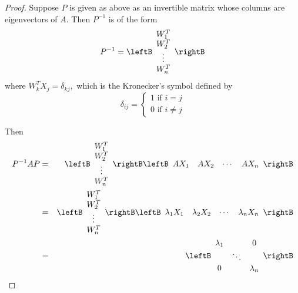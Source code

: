 \begin{proof}
Suppose $P$ is given as above as an invertible matrix whose columns are eigenvectors of $A$. Then $P^{-1}$
is of the form
\begin{equation*}
P^{-1}=\leftB
\begin{array}{c}
W_{1}^{T} \\
W_{2}^{T} \\
\vdots \\
W_{n}^{T}
\end{array}
\rightB
\end{equation*}
where $W_{k}^{T}X_{j}=\delta _{kj},$ which is the Kronecker's symbol defined by
\begin{equation*}
\delta _{ij}=\left\{
\begin{array}{c}
1
\text{ if }i=j \\
0\text{ if }i\neq j
\end{array}
\right.
\end{equation*}

Then
\begin{eqnarray*}
P^{-1}AP & = & 
\leftB
\begin{array}{c}
W_{1}^{T} \\
W_{2}^{T} \\
\vdots \\
W_{n}^{T}
\end{array}
\rightB \leftB
\begin{array}{cccc}
AX_{1} & AX_{2} & \cdots & AX_{n}
\end{array}
\rightB \\
& = & 
\leftB
\begin{array}{c}
W_{1}^{T} \\
W_{2}^{T} \\
\vdots \\
W_{n}^{T}
\end{array}
\rightB \leftB
\begin{array}{cccc}
\lambda _{1}X_{1} & \lambda _{2}X_{2} & \cdots & \lambda
_{n}X_{n}
\end{array}
\rightB \\
&=&
\leftB
\begin{array}{ccc}
\lambda _{1} &  & 0 \\
& \ddots &  \\
0 &  & \lambda _{n}
\end{array}
\rightB \\
\end{eqnarray*}


\end{proof}
